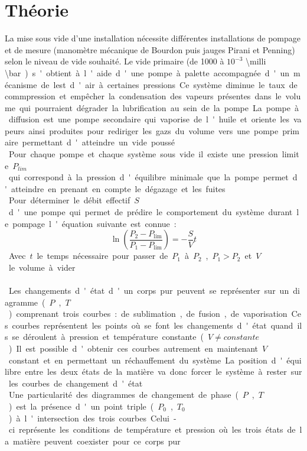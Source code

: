 \section{Théorie}

La mise sous vide d'une installation nécessite différentes installations de pompage et de mesure (manomètre mécanique de Bourdon puis jauges Pirani et Penning) selon le niveau de vide souhaité. Le vide primaire (de 1000 à \(10^{-3}\) \SI{\milli \bar}) s'obtient à l'aide d'une pompe à palette accompagnée d'un mécanisme de lest d'air à certaines pressions. Ce système diminue le taux de commpression et empêcher la condensation des vapeurs présentes dans le volume qui pourraient dégrader la lubrification au sein de la pompe. La pompe à diffusion est une pompe secondaire qui vaporise de l'huile et oriente les vapeurs ainsi produites pour rediriger les gazs du volume vers une pompe primaire permettant d'atteindre un vide poussé. \\
Pour chaque pompe et chaque système sous vide il existe une pression limite \(P_{lim}\) qui correspond à la pression d'équilibre minimale que la pompe permet d'atteindre en prenant en compte le dégazage et les fuites. \\
Pour déterminer le débit effectif \(S\) d'une pompe qui permet de prédire le comportement du système durant le pompage l'équation suivante est connue:
\begin{equation}
    \ln(\frac{P_\textrm{2} - P_\textrm{lim}}{P_\textrm{1} - P_\textrm{lim}}) = -\frac{S}{V}t
    \label{eq:cinetique}
\end{equation}
Avec \(t\) le temps nécessaire pour passer de \(P_\textrm{1}\) à \(P_\textrm{2}\), \(P_\textrm{1} > P_\textrm{2}\) et \(V\) le volume à vider \cite{notice}. \\
\\
Les changements d'état d'un corps pur peuvent se représenter sur un diagramme (\(P\), \(T\)) comprenant trois courbes: de sublimation, de fusion, de vaporisation. Ces courbes représentent les points où se font les changements d'état quand ils se déroulent à pression et température constante (\(V \neq constante\)). Il est possible d'obtenir ces courbes autrement en maintenant \(V\) constant et en permettant un réchauffement du système. La position d'équilibre entre les deux états de la matière va donc forcer le système à rester sur les courbes de changement d'état. \\
Une particularité des diagrammes de changement de phase (\(P\), \(T\)) est la présence d'un point triple (\(P_0\), \(T_0\)) à l'intersection des trois courbes. Celui-ci représente les conditions de température et pression où les trois états de la matière peuvent coexister pour ce corps pur.\\
